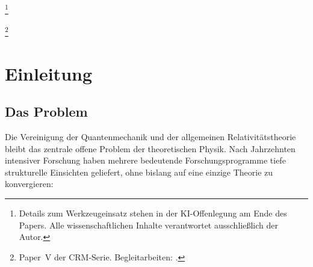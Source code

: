 \documentclass[aps,prd,twocolumn,superscriptaddress,nofootinbib]{revtex4-2}
\begin{document}

\thanks{Details zum Werkzeugeinsatz stehen in der KI-Offenlegung am Ende des Papers. Alle wissenschaftlichen Inhalte verantwortet ausschließlich der Autor.}

\thanks{Paper~V der CRM-Serie. Begleitarbeiten: \cite{Geiger2026,Geiger2026b,Geiger2026c,Geiger2026d}.}

\begin{titlepage}
\maketitle
\end{titlepage}

\fi

\section{Einleitung}
\label{sec:intro}

\subsection{Das Problem}

Die Vereinigung der Quantenmechanik und der allgemeinen Relativitätstheorie bleibt das zentrale offene Problem der theoretischen Physik. Nach Jahrzehnten intensiver Forschung haben mehrere bedeutende Forschungsprogramme tiefe strukturelle Einsichten geliefert, ohne bislang auf eine einzige Theorie zu konvergieren:
\end{document}
